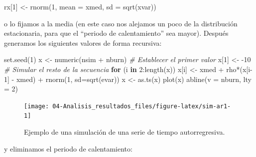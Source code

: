 \documentclass[
]{book}
\newenvironment{Shaded}{\begin{snugshade}}{\end{snugshade}}
\newcommand{\AttributeTok}[1]{\textcolor[rgb]{0.77,0.63,0.00}{#1}}
\newcommand{\CommentTok}[1]{\textcolor[rgb]{0.56,0.35,0.01}{\textit{#1}}}
\newcommand{\ControlFlowTok}[1]{\textcolor[rgb]{0.13,0.29,0.53}{\textbf{#1}}}
\newcommand{\DecValTok}[1]{\textcolor[rgb]{0.00,0.00,0.81}{#1}}
\newcommand{\FunctionTok}[1]{\textcolor[rgb]{0.00,0.00,0.00}{#1}}
\newcommand{\NormalTok}[1]{#1}
\newcommand{\OtherTok}[1]{\textcolor[rgb]{0.56,0.35,0.01}{#1}}
\newcommand{\SpecialCharTok}[1]{\textcolor[rgb]{0.00,0.00,0.00}{#1}}
\theoremstyle{break}
\theoremstyle{definition}
\theoremstyle{definition}
\theoremstyle{definition}
\theoremstyle{definition}
\theoremstyle{remark}
\begin{document}
\begin{Shaded}
\begin{Highlighting}[]
\NormalTok{rx[}\DecValTok{1}\NormalTok{] }\OtherTok{\textless{}{-}} \FunctionTok{rnorm}\NormalTok{(}\DecValTok{1}\NormalTok{, }\AttributeTok{mean =}\NormalTok{ xmed, }\AttributeTok{sd =} \FunctionTok{sqrt}\NormalTok{(xvar))}
\end{Highlighting}
\end{Shaded}

o lo fijamos a la media (en este caso nos alejamos un poco de la distribución estacionaria, para que el ``periodo de calentamiento'' sea mayor).
Después generamos los siguientes valores de forma recursiva:

\begin{Shaded}
\begin{Highlighting}[]
\FunctionTok{set.seed}\NormalTok{(}\DecValTok{1}\NormalTok{)}
\NormalTok{x }\OtherTok{\textless{}{-}} \FunctionTok{numeric}\NormalTok{(nsim }\SpecialCharTok{+}\NormalTok{ nburn)}
\CommentTok{\# Establecer el primer valor }
\NormalTok{x[}\DecValTok{1}\NormalTok{] }\OtherTok{\textless{}{-}} \SpecialCharTok{{-}}\DecValTok{10}
\CommentTok{\# Simular el resto de la secuencia}
\ControlFlowTok{for}\NormalTok{ (i }\ControlFlowTok{in} \DecValTok{2}\SpecialCharTok{:}\FunctionTok{length}\NormalTok{(x))}
\NormalTok{  x[i] }\OtherTok{\textless{}{-}}\NormalTok{ xmed }\SpecialCharTok{+}\NormalTok{ rho}\SpecialCharTok{*}\NormalTok{(x[i}\DecValTok{{-}1}\NormalTok{] }\SpecialCharTok{{-}}\NormalTok{ xmed) }\SpecialCharTok{+} \FunctionTok{rnorm}\NormalTok{(}\DecValTok{1}\NormalTok{, }\AttributeTok{sd=}\FunctionTok{sqrt}\NormalTok{(evar))}
\NormalTok{x }\OtherTok{\textless{}{-}} \FunctionTok{as.ts}\NormalTok{(x)}
\FunctionTok{plot}\NormalTok{(x)}
\FunctionTok{abline}\NormalTok{(}\AttributeTok{v =}\NormalTok{ nburn, }\AttributeTok{lty =} \DecValTok{2}\NormalTok{)}
\end{Highlighting}
\end{Shaded}

\begin{figure}[!htb]

{\centering \texttt{[image: 04-Analisis\_resultados\_files/figure-latex/sim-ar1-1]} 

}

\caption{Ejemplo de una simulación de una serie de tiempo autorregresiva.}\label{fig:sim-ar1}
\end{figure}

y eliminamos el periodo de calentamiento:
\end{document}
